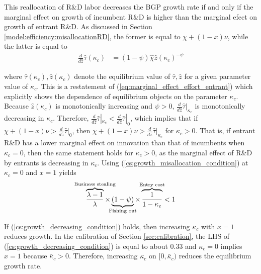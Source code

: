 \documentclass[11pt,english]{article}
\begin{document}
This reallocation of R\&D labor decreases the BGP growth rate if and only if the marginal effect on growth of incumbent R\&D is higher than the marginal efect on growth of entrant R\&D. As discussed in Section \ref{model:efficiency:misallocationRD}, the former is equal to $\chi + (1-x)\nu$, while the latter is equal to 
\begin{align}
\frac{d}{d\hat{z}} \hat{\tau}(\kappa_c) &= (1-\psi) \hat{\chi} \hat{z} (\kappa_c)^{-\psi} \label{eq:marginal_effect_effort_entrant_kappaC}
\end{align}

where $\hat{\tau}(\kappa_c), \hat{z}(\kappa_c)$ denote the equilibrium value of $\hat{\tau}, \hat{z}$ for a given parameter value of $\kappa_c$. This is a restatement of (\ref{eq:marginal_effect_effort_entrant}) which explicitly shows the dependence of equilibrium objects on the parameter $\kappa_c$. Because $\hat{z}(\kappa_c)$ is monotonically increasing and $\psi > 0$, $\frac{d}{d\hat{z}} \hat{\tau} |_{\kappa_c}$ is monotonically decreasing in $\kappa_c$. Therefore, $\frac{d}{d\hat{z}}\hat{\tau} |_{\kappa_c} < \frac{d}{d\hat{z}}\hat{\tau}|_0$, which implies that if $\chi + (1-x)\nu > \frac{d}{d\hat{z}} \hat{\tau} |_0$, then $\chi + (1-x)\nu > \frac{d}{d\hat{z}} \hat{\tau} |_{\kappa_c}$ for $\kappa_c > 0$. That is, if entrant R\&D has a lower marginal effect on innovation than that of incumbents when $\kappa_c = 0$, then the same statement holds for $\kappa_c > 0$, as the marginal effect of R\&D by entrants is decreasing in $\kappa_c$.  Using (\ref{cs:growth_misallocation_condition}) at $\kappa_c = 0$ and $x = 1$ yields
\begin{align} \overbrace{\frac{\lambda-1}{\lambda}}^{\mathclap{\text{Business stealing}}} \times \underbrace{(1-\psi)}_{\mathclap{\text{Fishing out}}} \times  \overbrace{\frac{1}{1-\kappa_{e}}}^{\mathclap{\text{Entry cost}}}< 1 \label{cs:growth_decreasing_condition}
\end{align}

If (\ref{cs:growth_decreasing_condition}) holds, then increasing $\kappa_c$ with $x = 1$ reduces growth. In the calibration of Section \ref{sec:calibration}, the LHS of (\ref{cs:growth_decreasing_condition}) is equal to about 0.33 and $\kappa_c = 0$ implies $x = 1$ because $\bar{\kappa}_c > 0$. Therefore, increasing $\kappa_c$ on $[0,\bar{\kappa}_c)$ reduces the equilibrium growth rate.
\end{document}
